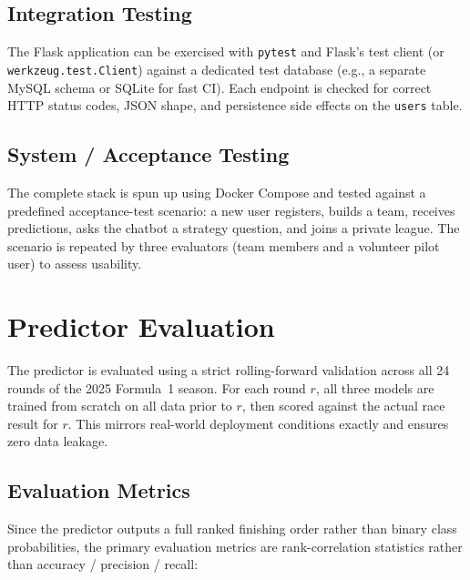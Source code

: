 \documentclass[12pt, a4paper, oneside]{report}
\begin{document}
\subsection{Integration Testing}

The Flask application can be exercised with \texttt{pytest} and Flask's test
client (or \texttt{werkzeug.test.Client}) against a dedicated test database
(e.g., a separate MySQL schema or SQLite for fast CI). Each endpoint is
checked for correct HTTP status codes, JSON shape, and persistence side effects
on the \texttt{users} table.

\subsection{System / Acceptance Testing}

The complete stack is spun up using Docker Compose and tested against a
predefined acceptance-test scenario: a new user registers, builds a team,
receives predictions, asks the chatbot a strategy question, and joins a private
league. The scenario is repeated by three evaluators (team members and a
volunteer pilot user) to assess usability.

\section{Predictor Evaluation}
\label{sec:pred-eval}

The predictor is evaluated using a strict rolling-forward validation across all
24 rounds of the 2025 Formula~1 season. For each round $r$, all three models
are trained from scratch on all data prior to $r$, then scored against the
actual race result for $r$. This mirrors real-world deployment conditions
exactly and ensures zero data leakage.

\subsection{Evaluation Metrics}
\label{subsec:eval-metrics}

Since the predictor outputs a full ranked finishing order rather than binary
class probabilities, the primary evaluation metrics are rank-correlation
statistics rather than accuracy / precision / recall:
\end{document}
